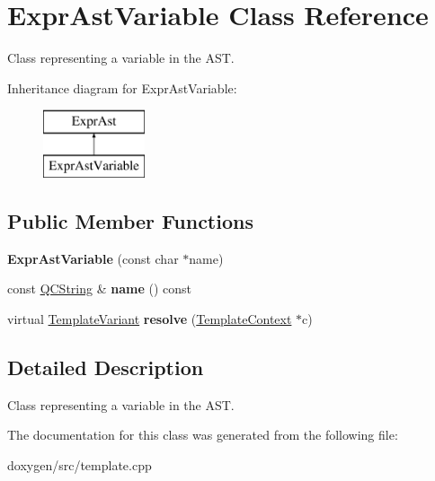 \hypertarget{class_expr_ast_variable}{}\section{Expr\+Ast\+Variable Class Reference}
\label{class_expr_ast_variable}


Class representing a variable in the A\+ST.  


Inheritance diagram for Expr\+Ast\+Variable\+:\begin{figure}[H]
\begin{center}
\leavevmode
\includegraphics[height=2.000000cm]{class_expr_ast_variable}
\end{center}
\end{figure}
\subsection*{Public Member Functions}
\begin{DoxyCompactItemize}
\item 
\mbox{\label{class_expr_ast_variable_aaaad0eb18a8abe3c069c44c208d9dd70}} 
{\bfseries Expr\+Ast\+Variable} (const char $\ast$name)
\item 
\mbox{\label{class_expr_ast_variable_af4a5e12501174ff871c597e7e8368e1e}} 
const \mbox{\hyperlink{class_q_c_string}{Q\+C\+String}} \& {\bfseries name} () const
\item 
\mbox{\label{class_expr_ast_variable_a76e7c3baa880897b24a9ceff6d69eb7d}} 
virtual \mbox{\hyperlink{class_template_variant}{Template\+Variant}} {\bfseries resolve} (\mbox{\hyperlink{class_template_context}{Template\+Context}} $\ast$c)
\end{DoxyCompactItemize}


\subsection{Detailed Description}
Class representing a variable in the A\+ST. 

The documentation for this class was generated from the following file\+:\begin{DoxyCompactItemize}
\item 
doxygen/src/template.\+cpp\end{DoxyCompactItemize}
